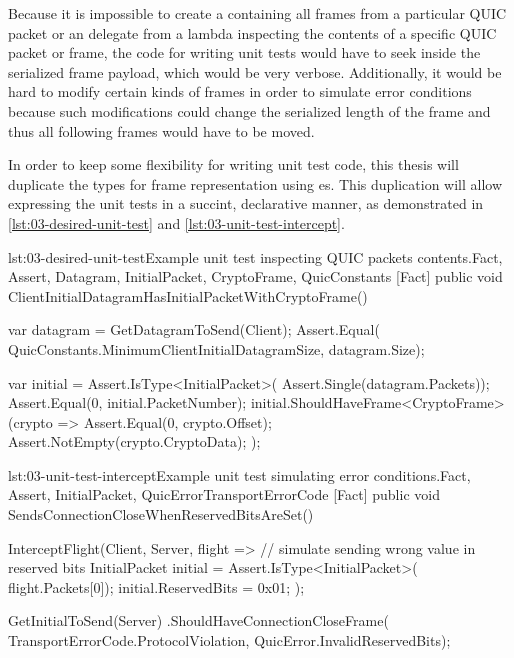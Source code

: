 
Because it is impossible to create a  containing all frames from a particular QUIC
packet or an  delegate from a lambda inspecting the contents of a specific QUIC
packet or frame, the code for writing unit tests would have to seek inside the serialized frame
payload, which would be very verbose. Additionally, it would be hard to modify certain kinds of
frames in order to simulate error conditions because such modifications could change the serialized
length of the frame and thus all following frames would have to be moved.

In order to keep some flexibility for writing unit test code, this thesis will duplicate the types
for frame representation using es. This duplication will allow expressing the unit
tests in a succint, declarative manner, as demonstrated in \autoref{lst:03-desired-unit-test} and
\autoref{lst:03-unit-test-intercept}.

\begin{myListing}{lst:03-desired-unit-test}{Example unit test inspecting QUIC packets contents.}{Fact, Assert, Datagram, InitialPacket, CryptoFrame, QuicConstants}{}
    [Fact]
    public void ClientInitialDatagramHasInitialPacketWithCryptoFrame()
    {
        var datagram = GetDatagramToSend(Client);
        Assert.Equal(
            QuicConstants.MinimumClientInitialDatagramSize,
            datagram.Size);

        var initial = Assert.IsType<InitialPacket>(
            Assert.Single(datagram.Packets));
        Assert.Equal(0, initial.PacketNumber);
        initial.ShouldHaveFrame<CryptoFrame>(crypto =>
        {
            Assert.Equal(0, crypto.Offset);
            Assert.NotEmpty(crypto.CryptoData);
        });
    }
\end{myListing}

\begin{myListing}{lst:03-unit-test-intercept}{Example unit test simulating error conditions.}{Fact, Assert, InitialPacket, QuicError}{TransportErrorCode}
    [Fact]
    public void SendsConnectionCloseWhenReservedBitsAreSet()
    {
        InterceptFlight(Client, Server, flight =>
        {
            // simulate sending wrong value in reserved bits
            InitialPacket initial = Assert.IsType<InitialPacket>(
                flight.Packets[0]);
            initial.ReservedBits = 0x01;
        });

        GetInitialToSend(Server)
            .ShouldHaveConnectionCloseFrame(
                TransportErrorCode.ProtocolViolation,
                QuicError.InvalidReservedBits);
    }
\end{myListing}

